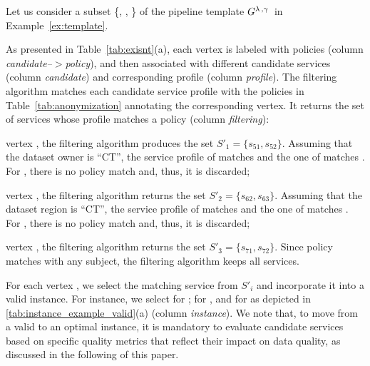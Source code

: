 
\begin{example}[\bf \pipelineInstance]\label{ex:instance}

Let us consider a subset \{, , \} of the pipeline template $G^{\lambda\,,\gamma\,}$ in Example~\ref{ex:template}.

As presented in Table~\ref{tab:exisnt}(a), each vertex is labeled with policies (column \emph{candidate--$>$policy}), and then associated with different candidate services (column \emph{candidate}) and corresponding profile (column \emph{profile}). The filtering algorithm matches each candidate service profile with the policies in Table~\ref{tab:anonymization} annotating the corresponding vertex. It returns the set of services whose profile matches a policy (column \emph{filtering}):
\begin{enumerate*}[label=\textit{\roman*})]
  \item vertex , the filtering algorithm produces the set $S'_1=\{s_{51},s_{52}\}$. Assuming that the dataset owner is ``CT'', the service profile of  matches  and the one of  matches . For , there is no policy match and, thus, it is discarded;
  \item vertex , the filtering algorithm returns the set $S'_2=\{s_{62},s_{63}\}$. Assuming that the dataset region is ``CT'', the service profile of  matches  and the one of  matches . For , there is no policy match and, thus, it is discarded;
  \item vertex , the filtering algorithm returns the set $S'_3=\{s_{71},s_{72}\}$. Since policy  matches with any subject, the filtering algorithm keeps all services.
\end{enumerate*}

For each vertex , we select the matching service  from $S'_i$ and incorporate it into a valid instance. For instance, we select  for ;  for , and  for 
as depicted in \cref{tab:instance_example_valid}(a) (column \emph{instance}). We note that, to move from a valid to an optimal instance, it is mandatory to evaluate candidate services based on specific quality metrics that reflect their impact on data quality, as discussed in the following of this paper.


\end{example}
